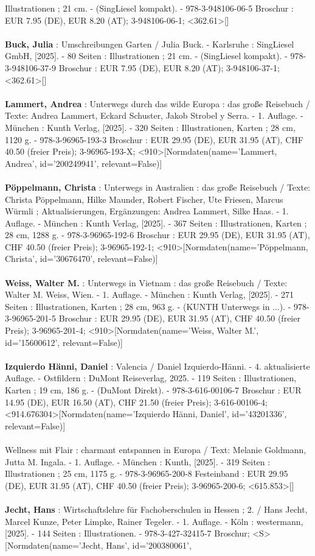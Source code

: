 \documentclass{article}
\begin{document}
\begin{multicols}{3}
Illustrationen ; 21 cm. - (SingLiesel kompakt). - 978-3-948106-06-5 Broschur : EUR 7.95 (DE), EUR 8.20 (AT); 3-948106-06-1; <362.61>[]\\\\\textbf{Buck, Julia} : Umschreibungen Garten / Julia Buck. - Karlsruhe : SingLiesel GmbH, [2025]. - 80 Seiten : Illustrationen ; 21 cm. - (SingLiesel kompakt). - 978-3-948106-37-9 Broschur : EUR 7.95 (DE), EUR 8.20 (AT); 3-948106-37-1; <362.61>[]\\\\\textbf{Lammert, Andrea} : Unterwegs durch das wilde Europa : das große Reisebuch / Texte: Andrea Lammert, Eckard Schuster, Jakob Strobel y Serra. - 1. Auflage. - München : Kunth Verlag, [2025]. - 320 Seiten : Illustrationen, Karten ; 28 cm, 1120 g. - 978-3-96965-193-3 Broschur : EUR 29.95 (DE), EUR 31.95 (AT), CHF 40.50 (freier Preis); 3-96965-193-X; <910>[Normdaten(name='Lammert, Andrea', id='200249941', relevant=False)]\\\\\textbf{Pöppelmann, Christa} : Unterwegs in Australien : das große Reisebuch / Texte: Christa Pöppelmann, Hilke Maunder, Robert Fischer, Ute Friesen, Marcus Würmli ; Aktualisierungen, Ergänzungen: Andrea Lammert, Silke Haas. - 1. Auflage. - München : Kunth Verlag, [2025]. - 367 Seiten : Illustrationen, Karten ; 28 cm, 1288 g. - 978-3-96965-192-6 Broschur : EUR 29.95 (DE), EUR 31.95 (AT), CHF 40.50 (freier Preis); 3-96965-192-1; <910>[Normdaten(name='Pöppelmann, Christa', id='30676470', relevant=False)]\\\\\textbf{Weiss, Walter M.} : Unterwegs in Vietnam : das große Reisebuch / Texte: Walter M. Weiss, Wien. - 1. Auflage. - München : Kunth Verlag, [2025]. - 271 Seiten : Illustrationen, Karten ; 28 cm, 963 g. - (KUNTH Unterwegs in ...). - 978-3-96965-201-5 Broschur : EUR 29.95 (DE), EUR 31.95 (AT), CHF 40.50 (freier Preis); 3-96965-201-4; <910>[Normdaten(name='Weiss, Walter M.', id='15600612', relevant=False)]\\\\\textbf{Izquierdo Hänni, Daniel} : Valencia / Daniel Izquierdo-Hänni. - 4. aktualisierte Auflage. - Ostfildern : DuMont Reiseverlag, 2025. - 119 Seiten : Illustrationen, Karten ; 19 cm, 186 g. - (DuMont Direkt). - 978-3-616-00106-7 Broschur : EUR 14.95 (DE), EUR 16.50 (AT), CHF 21.50 (freier Preis); 3-616-00106-4; <914.676304>[Normdaten(name='Izquierdo Hänni, Daniel', id='43201336', relevant=False)]\\\\Wellness mit Flair : charmant entspannen in Europa / Text: Melanie Goldmann, Jutta M. Ingala. - 1. Auflage. - München : Kunth, [2025]. - 319 Seiten : Illustrationen ; 25 cm, 1175 g. - 978-3-96965-200-8 Festeinband : EUR 29.95 (DE), EUR 31.95 (AT), CHF 40.50 (freier Preis); 3-96965-200-6; <615.853>[]\\\\\textbf{Jecht, Hans} : Wirtschaftslehre für Fachoberschulen in Hessen ; 2. / Hans Jecht, Marcel Kunze, Peter Limpke, Rainer Tegeler. - 1. Auflage. - Köln : westermann, [2025]. - 144 Seiten : Illustrationen. - 978-3-427-32415-7 Broschur; <S>[Normdaten(name='Jecht, Hans', id='200380061', 
\end{multicols}
\end{document}
